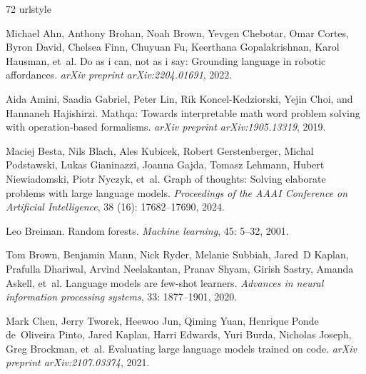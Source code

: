 \begin{thebibliography}{72}
\providecommand{\natexlab}[1]{#1}
\providecommand{\url}[1]{\texttt{#1}}
\expandafter\ifx\csname urlstyle\endcsname\relax
  \providecommand{\doi}[1]{doi: #1}\else
  \providecommand{\doi}{doi: \begingroup \urlstyle{rm}\Url}\fi

Michael Ahn, Anthony Brohan, Noah Brown, Yevgen Chebotar, Omar Cortes, Byron David, Chelsea Finn, Chuyuan Fu, Keerthana Gopalakrishnan, Karol Hausman, et~al.
\newblock Do as i can, not as i say: Grounding language in robotic affordances.
\newblock \emph{arXiv preprint arXiv:2204.01691}, 2022.

Aida Amini, Saadia Gabriel, Peter Lin, Rik Koncel-Kedziorski, Yejin Choi, and Hannaneh Hajishirzi.
\newblock Mathqa: Towards interpretable math word problem solving with operation-based formalisms.
\newblock \emph{arXiv preprint arXiv:1905.13319}, 2019.

Maciej Besta, Nils Blach, Ales Kubicek, Robert Gerstenberger, Michal Podstawski, Lukas Gianinazzi, Joanna Gajda, Tomasz Lehmann, Hubert Niewiadomski, Piotr Nyczyk, et~al.
\newblock Graph of thoughts: Solving elaborate problems with large language models.
\newblock \emph{Proceedings of the AAAI Conference on Artificial Intelligence}, 38 (16): 17682--17690, 2024.

Leo Breiman.
\newblock Random forests.
\newblock \emph{Machine learning}, 45: 5--32, 2001.

Tom Brown, Benjamin Mann, Nick Ryder, Melanie Subbiah, Jared~D Kaplan, Prafulla Dhariwal, Arvind Neelakantan, Pranav Shyam, Girish Sastry, Amanda Askell, et~al.
\newblock Language models are few-shot learners.
\newblock \emph{Advances in neural information processing systems}, 33: 1877--1901, 2020.

Mark Chen, Jerry Tworek, Heewoo Jun, Qiming Yuan, Henrique Ponde de~Oliveira Pinto, Jared Kaplan, Harri Edwards, Yuri Burda, Nicholas Joseph, Greg Brockman, et~al.
\newblock Evaluating large language models trained on code.
\newblock \emph{arXiv preprint arXiv:2107.03374}, 2021.


\end{thebibliography}
